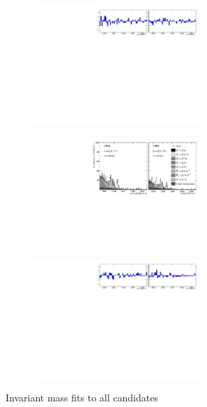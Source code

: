 \begin{figure}[!h]
\begin{subfigure}[t]{1.0\textwidth}
        \includegraphics[width=0.7\textwidth]{figs/Appendix_FitCategories/residuals_DsPhi_merged_both_summed_splitHel_splitKKPi_s21_s21r1_s24_s26.pdf}
    \end{subfigure}
    \begin{subfigure}[t]{1.0\textwidth}
        \centering
        \includegraphics[width=0.7\textwidth]{figs/Appendix_FitCategories/canvas_DsPhiSide_merged_both_summed_splitHel_splitKKPi_s21_s21r1_s24_s26.pdf}\\
        \includegraphics[width=0.7\textwidth]{figs/Appendix_FitCategories/residuals_DsPhiSide_merged_both_summed_splitHel_splitKKPi_s21_s21r1_s24_s26.pdf}
    \end{subfigure}
    \caption{Invariant mass fits to all \decay{\Bp}{\Dsp\phiz} candidates}
\end{figure}




